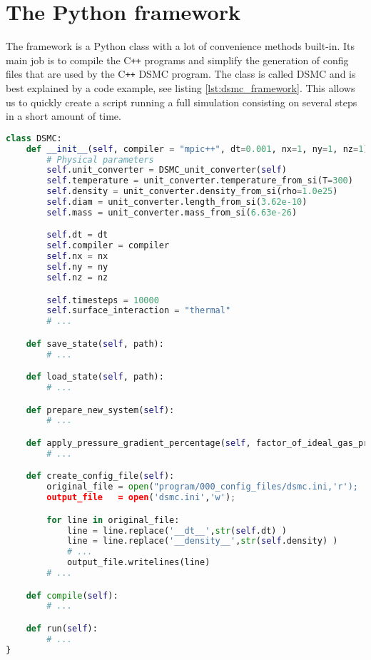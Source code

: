 \section{The Python framework}
The framework is a Python class with a lot of convenience methods built-in. Its main job is to compile the C{}\verb!++! programs and simplify the generation of config files that are used by the C{}\verb!++! DSMC program. The class is called DSMC and is best explained by a code example, see listing \ref{lst:dsmc_framework}. This allows us to quickly create a script running a full simulation consisting on several steps in a short amount of time.
\begin{lstlisting}[caption=dsmcconfig.py. This program illustrates how the framework script is created. A lot of convenience functions are built-in so that running a simulation is a simple process. The create\_config\_file() function replaces the string \_\_value\_\_ in a dummy config file with the real value stored in the class. , label=lst:dsmc_framework, language=Python]
	class DSMC:
	def __init__(self, compiler = "mpic++", dt=0.001, nx=1, ny=1, nz=1):
		# Physical parameters
		self.unit_converter = DSMC_unit_converter(self)
		self.temperature = unit_converter.temperature_from_si(T=300) 
		self.density = unit_converter.density_from_si(rho=1.0e25)
		self.diam = unit_converter.length_from_si(3.62e-10)
		self.mass = unit_converter.mass_from_si(6.63e-26)

		self.dt = dt
		self.compiler = compiler
		self.nx = nx
		self.ny = ny
		self.nz = nz

		self.timesteps = 10000
		self.surface_interaction = "thermal"
		# ...

	def save_state(self, path):
		# ...

	def load_state(self, path):
		# ...

	def prepare_new_system(self):
		# ...

	def apply_pressure_gradient_percentage(self, factor_of_ideal_gas_pressure):
		# ...

	def create_config_file(self):
		original_file = open("program/000_config_files/dsmc.ini,'r');
		output_file   = open('dsmc.ini','w');

		for line in original_file:
			line = line.replace('__dt__',str(self.dt) )
			line = line.replace('__density__',str(self.density) )
			# ...
			output_file.writelines(line)
		# ...

	def compile(self):
		# ...

	def run(self):
		# ...
}
\end{lstlisting}

